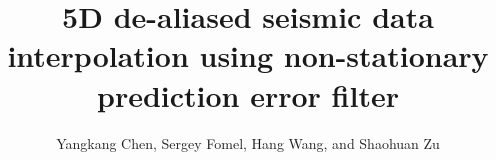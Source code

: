 \DeclareRobustCommand{\dlo}[1]{}
\DeclareRobustCommand{\wen}[1]{#1}


\title{5D de-aliased seismic data interpolation using non-stationary prediction error filter}

\author{Yangkang Chen\footnotemark[1], Sergey Fomel\footnotemark[2], Hang Wang\footnotemark[1], and Shaohuan Zu\footnotemark[3]}

\renewcommand{\thefootnote}{\fnsymbol{footnote}}



\address{
\footnotemark[1]
School of Earth Sciences\\
Zhejiang University\\
Hangzhou, Zhejiang Province, China, 310027\\
chenyk2016@gmail.com \\
\footnotemark[2]Bureau of Economic Geology \\
John A. and Katherine G. Jackson School of Geosciences \\
The University of Texas at Austin \\
University Station, Box X \\
Austin, TX 78713-8924 \\
sergey.fomel@beg.utexas.edu\\
\footnotemark[3] College of Geophysics\\
Chengdu University of Technology \\
Dongsanlu, Erxianqiao, Chengdu 610059, Sichuan, China\\
Corresponding author: Yangkang Chen, chenyk2016@gmail.com
}


\maketitle

